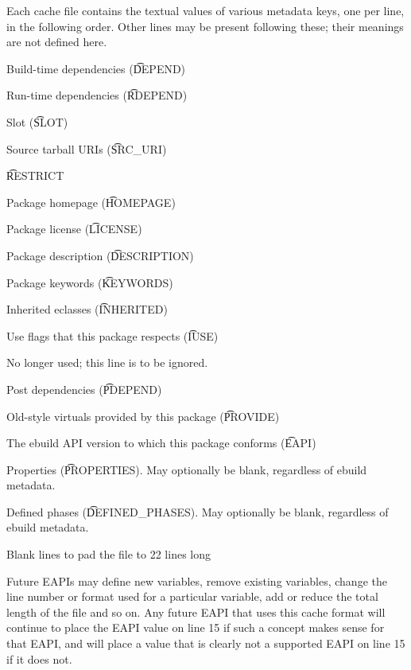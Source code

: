 Each cache file contains the textual values of various metadata keys, one per line, in the following
order. Other lines may be present following these; their meanings are not defined here.

\begin{compactenum}
\item Build-time dependencies (\t{DEPEND})
\item Run-time dependencies (\t{RDEPEND})
\item Slot (\t{SLOT})
\item Source tarball URIs (\t{SRC\_URI})
\item \t{RESTRICT}
\item Package homepage (\t{HOMEPAGE})
\item Package license (\t{LICENSE})
\item Package description (\t{DESCRIPTION})
\item Package keywords (\t{KEYWORDS})
\item Inherited eclasses (\t{INHERITED})
\item Use flags that this package respects (\t{IUSE})
\item No longer used; this line is to be ignored.
\item Post dependencies (\t{PDEPEND})
\item Old-style virtuals provided by this package (\t{PROVIDE})
\item The ebuild API version to which this package conforms (\t{EAPI})
\item Properties (\t{PROPERTIES}). May optionally be blank, regardless of ebuild metadata.
\item Defined phases (\t{DEFINED\_PHASES}). May optionally be blank, regardless of ebuild metadata.
\item Blank lines to pad the file to 22 lines long
\end{compactenum}

Future EAPIs may define new variables, remove existing variables, change the line number or
format used for a particular variable, add or reduce the total length of the file and so on.
Any future EAPI that uses this cache format will continue to place the EAPI value on
line 15 if such a concept makes sense for that EAPI, and will place a value that is clearly
not a supported EAPI on line 15 if it does not.


